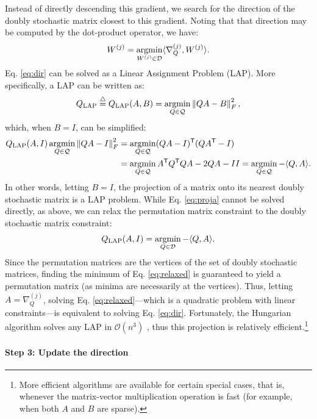 \documentclass{article} %
\providecommand{\norm}[1]{\left \lVert#1 \right  \rVert}
\newcommand{\argmin}{\operatornamewithlimits{argmin}}
\newcommand{\T}{^{\ensuremath{\mathsf{T}}}}           %
\providecommand{\mc}[1]{\mathcal{#1}}
\newcommand{\defeq}{\overset{\triangle}{=}}
\begin{document}
Instead of directly descending this gradient, we search for the direction of the doubly stochastic matrix closest to this gradient. Noting that that direction may be computed by the dot-product operator, we have:
\begin{align}\label{eq:dir}
	W^{(j)} = \argmin_{W^{(j)} \in \mc{D}} \langle \nabla_Q^{(j)},W^{(j)} \rangle. %
\end{align}
Eq. \eqref{eq:dir} can be solved as a Linear Assignment Problem (LAP).  More specifically, a LAP can be written as:
\begin{align} \label{eq:LAP}
	Q_{\text{LAP}} \defeq Q_{\text{LAP}}(A,B) = \argmin_{Q \in \mc{Q}} \norm{QA - B }^2_F,
\end{align}
which, when $B=I$, can be simplified:
\begin{align} \label{eq:proja}
	Q_{\text{LAP}}(A,I) \argmin_{Q \in \mc{Q}} \norm{QA - I}_F^2 &= \argmin_{Q \in \mc{Q}} (QA-I)\T (QA\T-I) 
\nonumber\\ &=\argmin_{Q \in \mc{Q}} A\T Q\T QA -2QA - II = \argmin_{Q \in \mc{Q}}  -\langle Q, A \rangle.  
\end{align}
In other words, letting $B=I$, the projection of a matrix onto its nearest doubly stochastic matrix is a LAP problem.  While Eq. \eqref{eq:proja} cannot be solved directly, as above, we can relax the permutation matrix constraint to the doubly stochastic matrix constraint:
\begin{align}\label{eq:relaxed}
	Q_{\text{LAP}}(A,I) = \argmin_{Q\in\mc{D}} -\langle Q, A \rangle. 
\end{align}
Since the permutation matrices are the vertices of the set of doubly stochastic matrices, finding the minimum of Eq. \eqref{eq:relaxed} is guaranteed to yield a permutation matrix (as minima are necessarily at the vertices).  Thus, letting $A=\nabla_Q^{(j)}$, solving Eq. \eqref{eq:relaxed}---which is a quadratic problem with linear constraints---is equivalent to solving Eq. \eqref{eq:dir}.  Fortunately, the Hungarian algorithm solves any LAP in $\mc{O}(n^3)$ \cite{Burkard2009}, thus this projection is relatively efficient.\footnote{More efficient algorithms are available for certain special cases, that is, whenever the matrix-vector multiplication operation is fast (for example, when both $A$ and $B$ are sparse).}

\paragraph{Step 3: Update the direction} %
\label{par:step_3_updating_the_direction}
\end{document}
